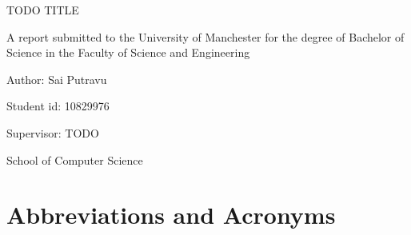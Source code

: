 \documentclass[10pt,oneside]{report}
\renewcommand{\large}{\fontsize{10}{12}\selectfont}
\renewcommand{\LARGE}{\fontsize{13}{15.6}\selectfont}
\begin{document}
\begin{titlepage}
    \centering
    {\LARGE TODO TITLE\\\par}
    \vspace{2cm}
    {\large A report submitted to the University of Manchester for the degree of
    Bachelor of Science in the Faculty of Science and Engineering\par}
    \vspace{2cm}
    \vspace{1cm}

    {\large Author: Sai Putravu\par}
    {\large Student id: 10829976\par}
    {\large Supervisor: TODO\par}
    \vfill
    {\large 2025\par}
    \vspace{1cm}
    {\large School of Computer Science\par}
\end{titlepage}


\tableofcontents
\clearpage

\listoffigures
\clearpage

\listoftables
\clearpage


{}
\chapter*{Abbreviations and Acronyms}
\end{document}
